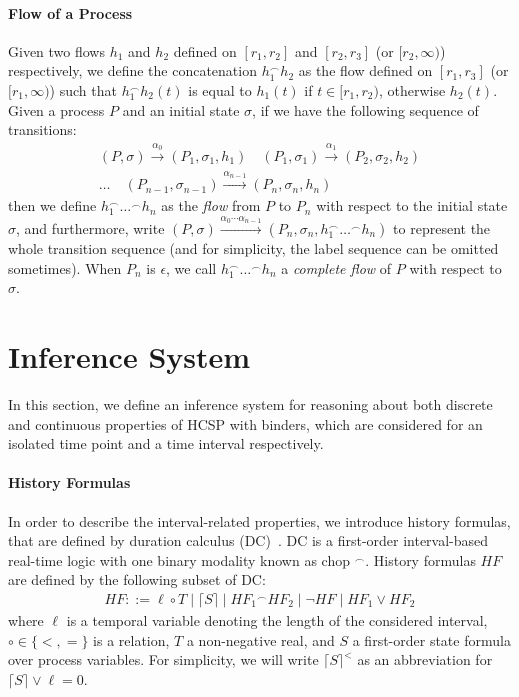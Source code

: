 \documentclass{llncs}
\newcommand{\leadm}[1]{\xrightarrow{#1}}
\newcommand{\pstop}{\epsilon}
\newcommand{\chop}{\smallfrown}
\newcommand{\dceil}[1]{\lceil #1 \rceil}
\begin{document}
\paragraph{\textbf{Flow of a Process}}
Given two flows $h_1$ and $h_2$ defined on $[r_1, r_2]$ and $[r_2, r_3]$ (or $[r_2, \infty)$)
respectively, we define the concatenation  $h_1 ^\chop h_2 $ as the
flow defined on $[r_1, r_3]$ (or $[r_1, \infty)$) such that $h_1 ^\chop h_2 (t)$ is equal to $h_1(t)$ if $t\in [r_1, r_2)$, otherwise
$h_2(t)$. Given a process $P$ and an initial state $\sigma$, if we have the following sequence of transitions:
\[
\begin{array}{l}
   (P, \sigma) \leadm{\alpha_0} (P_1, \sigma_1, h_1) \quad
   (P_1, \sigma_1) \leadm{\alpha_1} (P_2, \sigma_2, h_2)\\
   \ldots \quad
   (P_{n-1}, \sigma_{n-1}) \leadm{\alpha_{n-1}} (P_n, \sigma_n, h_n)
\end{array}\]
then we define $h_1 ^\chop \ldots ^\chop h_n$ as the \emph{flow} from $P$ to $P_n$ with respect to the initial state $\sigma$,
and furthermore, write
$(P, \sigma) \leadm{\alpha_0 \cdots \alpha_{n-1}} (P_n, \sigma_n, h_1 ^\chop \ldots ^\chop h_n)$
to represent the whole transition sequence (and for simplicity, the label sequence can be omitted sometimes).
When $P_n$ is $\pstop$, we call $h_1 ^\chop \ldots ^\chop h_n$ a \emph{complete flow} of $P$ with respect to  $\sigma$.


\section{Inference System}
\label{sec:inference}

In this section, we define an inference system for reasoning about both discrete and continuous properties of HCSP with binders,
which are considered for an isolated time point and a time interval respectively.


\paragraph{\textbf{History Formulas}}
In order to describe the interval-related properties,
we  introduce history formulas,  that are defined by duration calculus (DC)~\cite{ZHR91,ZH04}.
DC is a first-order interval-based
real-time logic with one binary modality known as chop $^\chop$. History formulas $HF$ are defined
by the following subset of DC:
\[
\begin{array}{lll}
  HF ::=  \ell \circ T \mid \dceil{S} \mid  HF_1 {}^\chop HF_2 \mid \neg HF \mid HF_1 \vee HF_2
\end{array}\]
where $\ell$ is a temporal variable denoting the length
of the considered interval, $\circ \in \{<, =\}$ is a relation,  $T$ a non-negative real,
and $S$  a first-order state formula over process variables. For simplicity, we will write
$\dceil{S}^<$ as an abbreviation for $\dceil{S} \vee \ell=0$.
\end{document}

